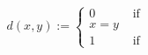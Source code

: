 \documentclass[preview]{standalone}
\begin{document}
\begin{align*}
d(x,y) := \begin{cases}0  &  \text{ if} \\ x=y \\1 &  \text{ if}\end{cases}
\end{align*}
\end{document}
